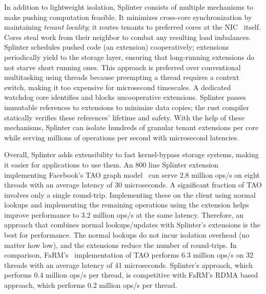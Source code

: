 In addition to lightweight isolation, Splinter consists of multiple
mechanisms to make pushing computation feasible.
%
It minimizes cross-core synchronization
by maintaining \emph{tenant locality};
%
it routes tenants
to preferred cores at the NIC~\cite{flow-director} itself.
%
Cores
steal work from
their neighbor to combat any resulting load imbalances.
%
Splinter schedules pushed code (an extension) cooperatively; extensions
periodically yield to the storage layer, ensuring that long-running
extensions do not starve short running ones.
%
This
approach is preferred over conventional multitasking using threads
because preempting a thread requires a context switch, making it too
expensive for microsecond timescales.
%
A dedicated watchdog core identifies and blocks uncooperative
extensions.
%
Splinter passes immutable references to extensions to minimize data
copies; the rust compiler statically verifies these references' lifetime
and safety.
%
With the help of these mechanisms, Splinter can isolate
hundreds of granular tenant extensions per core while serving millions of
operations per second with microsecond latencies.

Overall, Splinter adds extensibility to fast kernel-bypass storage
systems, making it easier for applications to use them.
%
An 800 line Splinter extension implementing Facebook’s TAO graph
model~\cite{tao-2013}
can serve 2.8 million ops/s on eight threads with an average latency of
30 microseconds.
%
A significant fraction of TAO involves only a single
round-trip.
%
Implementing these on the client using normal lookups and
implementing the remaining operations using the extension helps improve
performance to 3.2 million ops/s at the same latency.
%
Therefore, an
approach that combines normal lookups/updates with Splinter’s extensions
is the best for performance.
%
The normal lookups do not incur isolation
overhead (no matter how low), and the extensions reduce the number of
round-trips.
%
In comparison, FaRM’s~\cite{farm-2014} implementation of TAO performs
6.3 million
ops/s on 32 threads with an average latency of 41 microseconds.
%
Splinter’s approach, which performs 0.4 million ops/s per thread,
is competitive with FaRM’s RDMA based approach, which performs 0.2 million
ops/s per thread.
